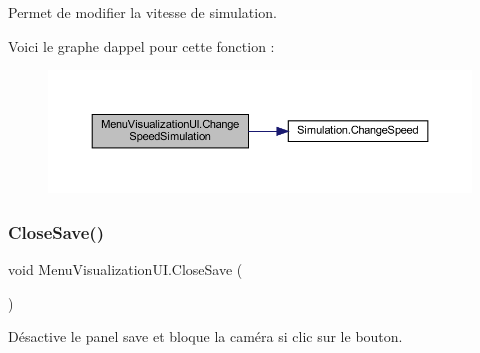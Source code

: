 Permet de modifier la vitesse de simulation. 

Voici le graphe d\textquotesingle{}appel pour cette fonction \+:\nopagebreak
\begin{figure}[H]
\begin{center}
\leavevmode
\includegraphics[width=350pt]{class_menu_visualization_u_i_abae4f4813543053bd5fc9d68ed4916d5_cgraph}
\end{center}
\end{figure}
\mbox{\label{class_menu_visualization_u_i_a262b9857eed5d1a7e749beb653a88cad}} 
\subsubsection{\texorpdfstring{Close\+Save()}{CloseSave()}}
{\footnotesize\ttfamily void Menu\+Visualization\+U\+I.\+Close\+Save (\begin{DoxyParamCaption}{ }\end{DoxyParamCaption})\hspace{0.3cm}{\ttfamily [inline]}}



Désactive le panel save et bloque la caméra si clic sur le bouton. 

